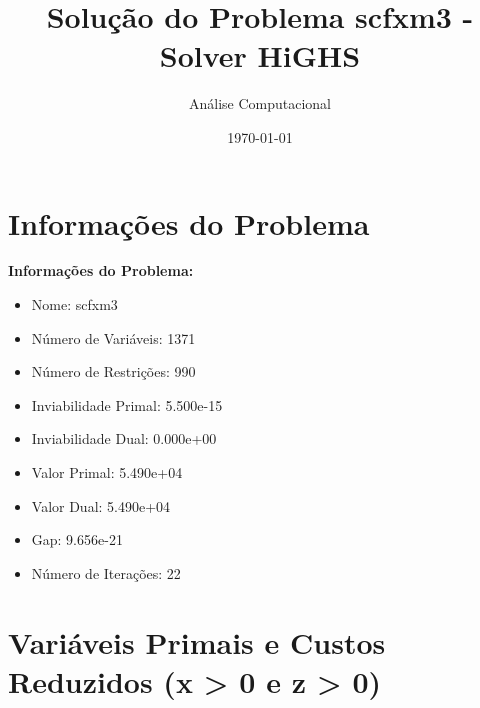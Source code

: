 \documentclass[12pt]{article}
\title{Solução do Problema scfxm3 - Solver HiGHS}
\author{Análise Computacional}
\date{\today}
\begin{document}
\maketitle

\section{Informações do Problema}

\textbf{Informações do Problema:}
\begin{itemize}
\item Nome: scfxm3
\item Número de Variáveis: 1371
\item Número de Restrições: 990
\item Inviabilidade Primal: 5.500e-15
\item Inviabilidade Dual: 0.000e+00
\item Valor Primal: 5.490e+04
\item Valor Dual: 5.490e+04
\item Gap: 9.656e-21
\item Número de Iterações: 22
\end{itemize}


\section{Variáveis Primais e Custos Reduzidos (x > 0 e z > 0)}
\end{document}
